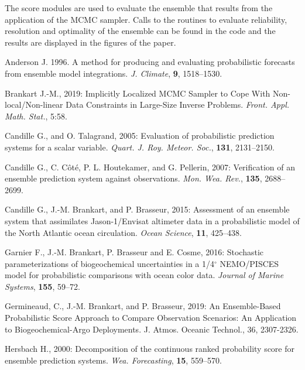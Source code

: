 \documentclass[11pt]{article}
\begin{document}
The score modules are used to evaluate the ensemble
that results from the application of the MCMC sampler.
Calls to the routines to evaluate reliability, resolution and optimality
of the ensemble can be found in the code and the results
are displayed in the figures of the paper.

\clearpage

\begin{thebibliography}{}

Anderson J. 1996. A method for producing and evaluating probabilistic forecasts from ensemble model integrations. {\it J. Climate}, {\bf 9}, 1518--1530.

Brankart J.-M., 2019:
Implicitly Localized MCMC Sampler to Cope
With Non-local/Non-linear Data Constraints in Large-Size Inverse Problems.
\textit{Front. Appl. Math. Stat.}, 5:58.

Candille G., and O. Talagrand, 2005:
Evaluation of probabilistic prediction systems for a scalar variable.
{\it Quart. J. Roy. Meteor. Soc.}, {\bf 131}, 2131--2150.

Candille G., C. C\^ot\'e, P. L. Houtekamer, and G. Pellerin, 2007:
Verification of an ensemble prediction system against observations.
{\it Mon. Wea. Rev.}, {\bf 135}, 2688--2699.

Candille G., J.-M. Brankart, and P. Brasseur, 2015:
Assessment of an ensemble system that assimilates Jason-1/Envisat altimeter data
in a probabilistic model of the North Atlantic ocean circulation.
\textit{Ocean Science}, \textbf{11}, 425--438.

Garnier F., J.-M. Brankart, P. Brasseur and E. Cosme, 2016:
Stochastic parameterizations of biogeochemical uncertainties
in a 1/4$^\circ$ NEMO/PISCES model for probabilistic comparisons
with ocean color data.
\textit{Journal of Marine Systems}, \textbf{155}, 59--72.

Germineaud, C., J.-M. Brankart, and P. Brasseur, 2019: An Ensemble-Based Probabilistic Score Approach to Compare Observation Scenarios: An Application to Biogeochemical-Argo Deployments. J. Atmos. Oceanic Technol., 36, 2307-2326.

Hersbach H., 2000:
Decomposition of the continuous ranked probability score for ensemble prediction systems.
\textit{Wea. Forecasting}, \textbf{15}, 559--570.


\end{thebibliography}
\end{document}
